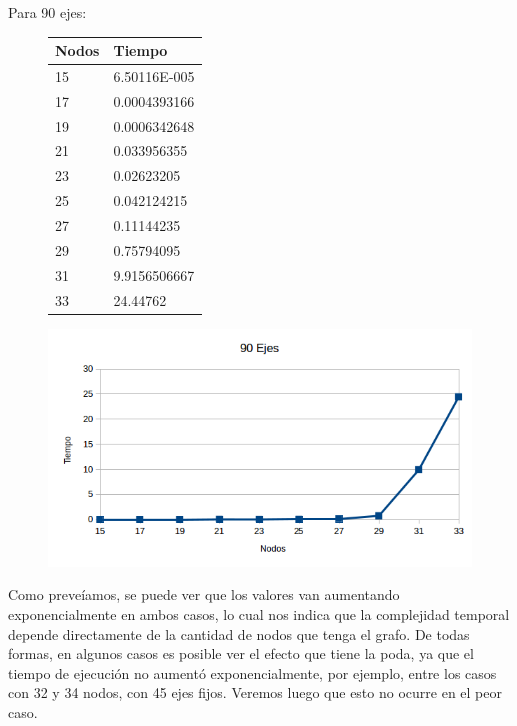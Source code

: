 \newpage 
 Para 90 ejes: \\
 
 \begin{figure}[h!]
   \begin{center}
 \begin{tabular}{| l | l |}
  \hline
Nodos & Tiempo \\ \hline
15 & 6.50116E-005 \\ \hline
17 & 0.0004393166 \\ \hline
19 & 0.0006342648 \\ \hline
21 & 0.033956355 \\ \hline
23 & 0.02623205 \\ \hline
25 & 0.042124215 \\ \hline
27 & 0.11144235 \\ \hline
29 & 0.75794095 \\ \hline
31 & 9.9156506667 \\ \hline
33 & 24.44762 \\ \hline
 \end{tabular}
   \end{center}
 \end{figure}
 
 
 \begin{figure}[h!]
   \begin{center}
 	\includegraphics[scale=0.7]{imagenes/exacto/90Ejes.png}
   \end{center}
 \end{figure}
 
Como preve\'iamos, se puede ver que los valores van aumentando exponencialmente en ambos casos, lo cual nos indica que la complejidad temporal depende directamente de la cantidad de nodos que tenga
el grafo.
De todas formas, en algunos casos es posible ver el efecto que tiene la poda, ya que el tiempo de ejecuci\'on no aument\'o exponencialmente, por ejemplo, entre los casos con 32 y 34 nodos, con 45 ejes fijos.
Veremos luego que esto no ocurre en el peor caso.\\

